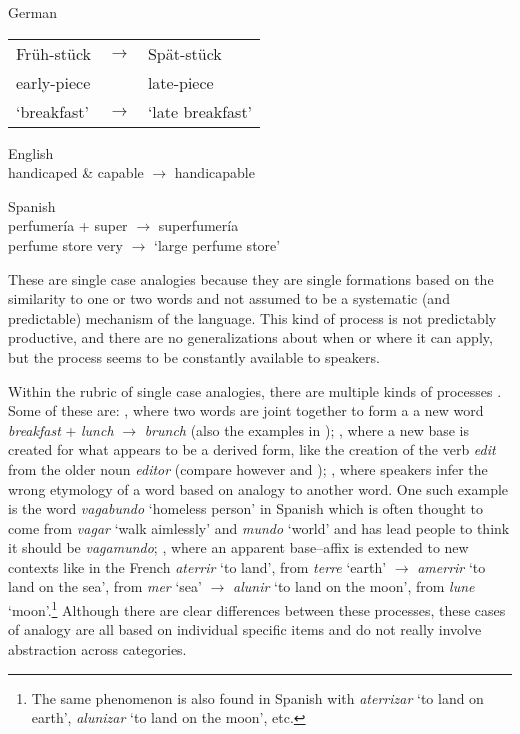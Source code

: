 \begin{exe}
    \ex \label{exe-germ-en1} German\\
    \begin{tabular}[t]{@{}lcl}
      Früh-stück & $\rightarrow$& Spät-stück\\
      early-piece &&late-piece\\
      `breakfast' &$\rightarrow$& `late breakfast'\\
    \end{tabular}
    \ex English\\
    handicaped \& capable  $\rightarrow$ handicapable

    \ex \label{blends-spanish} Spanish\\
    \gll perfumería  + super $\rightarrow$ superfumería \\
    {perfume store} {} very $\rightarrow$ {`large perfume store'}\\

\end{exe}

These are single case analogies because they are single formations based on the similarity to one or two words and not assumed to be a systematic (and predictable) mechanism of the language. This kind of process is not predictably productive, and there are no generalizations about when or where it can apply, but the process seems to be constantly available to speakers. 

Within the rubric of single case analogies, there are multiple kinds of processes \autocite[278]{Anderson.2015}. Some of these are: , where two words are joint together to form a a new word \textit{breakfast} + \textit{lunch} $\rightarrow$ \textit{brunch} (also the examples in ); , where a new base is created for what appears to be a derived form, like the creation of the verb \textit{edit} from the older noun \textit{editor} (compare however \citealt{vanMarle.1985} and \citealt{Becker.1993}); , where speakers infer the wrong etymology of a word based on analogy to another word. One such example is the word \textit{vaga\emph{bundo}} `homeless person' in Spanish which is often thought to come from \textit{vagar} `walk aimlessly' and \textit{mundo} `world' and has lead people to think it should be \textit{vaga\emph{m}undo};  \autocite{Kilani-Schoch.2005}, where an apparent base--affix is extended to new contexts like in the French \textit{aterrir} `to land', from \textit{terre} `earth' $\rightarrow$ \textit{amerrir} `to land on the sea', from \textit{mer} `sea' $\rightarrow$ \textit{alunir} `to land on the moon', from \textit{lune} `moon'.\footnote{The same phenomenon is also found in Spanish with \textit{aterrizar} `to land on earth', \textit{alunizar} `to land on the moon', etc.} Although there are clear differences between these processes, these cases of analogy are all based on individual specific items and do not really involve abstraction across categories.

